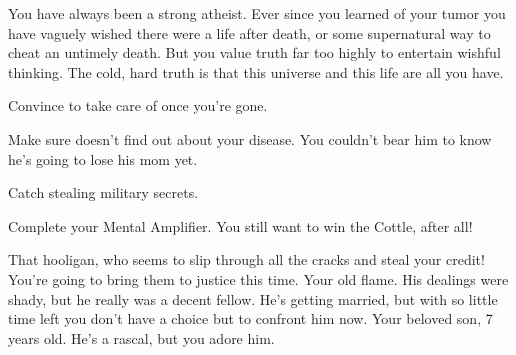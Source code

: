 \documentclass[char]{guildcamp1}
\begin{document}
You have always been a strong atheist.  Ever since you learned of your tumor you have vaguely wished there were a life after death, or some supernatural way to cheat an untimely death.  But you value truth far too highly to entertain wishful thinking.  The cold, hard truth is that this universe and this life are all you have.



\begin{itemz}[Goals]
  \item Convince \cGroomA{} to take care of \cKid{} once you're gone.
  \item Make sure \cKid{} doesn't find out about your disease. You couldn't bear him to know he's going to lose his mom yet.
  \item Catch \cRival{} stealing military secrets.
  \item Complete your Mental Amplifier. You still want to win the Cottle, after all!
\end{itemz}

\begin{contacts}
  \contact{\cRival{}} That hooligan, who seems to slip through all the cracks and steal your credit! You're going to bring them to justice this time.
  \contact{\cGroomA{}} Your old flame. His dealings were shady, but he really was a decent fellow. He's getting married, but with so little time left you don't have a choice but to confront him now.
    \contact{\cKid{}} Your beloved son, 7 years old. He's a rascal, but you adore him.
\end{contacts}
\end{document}
